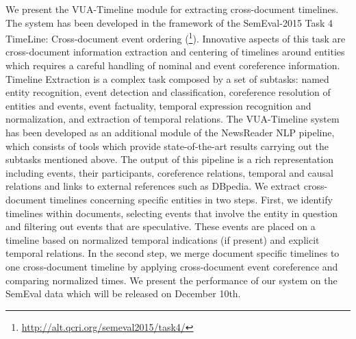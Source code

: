 \documentclass[10pt, a4paper, twopage, headinclude, footinclude, BCOR5mm]{book}
\begin{document}
\begin{table}[t!]
\end{table} 
\noindent
We present the VUA-Timeline module for extracting cross-document timelines. The system has been developed in the framework of the SemEval-2015 Task 4 TimeLine: Cross-document event ordering (\footnote{\url{http://alt.qcri.org/semeval2015/task4/}}). Innovative aspects of this task are cross-document information extraction and centering of timelines around entities which requires a careful handling of nominal and event coreference information.  Timeline Extraction is a complex task composed by a set of subtasks: named entity recognition, event detection and classification, coreference resolution of entities and events, event factuality, temporal expression recognition and normalization, and extraction of temporal relations. The VUA-Timeline system has been developed as an additional module of the NewsReader NLP pipeline, which consists of tools which provide state-of-the-art results carrying out the subtasks mentioned above. The output of this pipeline is a rich representation including events, their participants, coreference relations, temporal and causal relations and links to external references such as DBpedia. We extract cross-document timelines concerning specific entities in two steps. First, we identify timelines within documents, selecting events that involve the entity in question and filtering out events that are speculative. These events are placed on a timeline based on normalized temporal indications (if present) and explicit temporal relations. In the second step, we merge document specific timelines to one cross-document timeline by applying cross-document event coreference and comparing normalized times. We present the performance of our system on the SemEval data which will be released on December 10th.  
\end{document}
